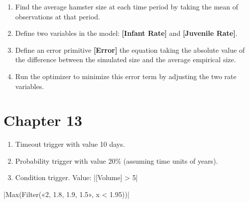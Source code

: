 \documentclass[]{memoir}
\newcommand{\DecValTok}[1]{\textcolor[rgb]{0.25,0.63,0.44}{{#1}}}
\newcommand{\FloatTok}[1]{\textcolor[rgb]{0.25,0.63,0.44}{{#1}}}
\newcommand{\FunctionTok}[1]{\textcolor[rgb]{0.02,0.16,0.49}{{#1}}}
\newcommand{\NormalTok}[1]{{#1}}
\newcommand{\p}[1]{\textbf{{[}#1{]}}}
\begin{document}
\begin{enumerate}
\def\labelenumi{\arabic{enumi}.}
\itemsep1pt\parskip0pt
\item
  Find the average hamster size at each time period by taking the mean
  of observations at that period.
\item
  Define two variables in the model: \p{Infant Rate} and
  \p{Juvenile Rate}.
\item
  Define an error primitive \p{Error} the equation taking the absolute
  value of the difference between the simulated size and the average
  empirical size.
\item
  Run the optimizer to minimize this error term by adjusting the two
  rate variables.
\end{enumerate}

\section{Chapter 13}


\begin{enumerate}
\def\labelenumi{\arabic{enumi}.}
\itemsep1pt\parskip0pt
\item
  Timeout trigger with value 10 days.
\item
  Probability trigger with value 20\% (assuming time units of years).
\item
  Condition trigger. Value: |\NormalTok{[Volume] > }\DecValTok{5}|
\end{enumerate}


|\FunctionTok{Max}\NormalTok{(}\FunctionTok{Filter}\NormalTok{(«2, }\FloatTok{1.8}\NormalTok{, }\FloatTok{1.9}\NormalTok{, }\FloatTok{1.5}\NormalTok{», x < }\FloatTok{1.95}\NormalTok{))}|

\end{document}

